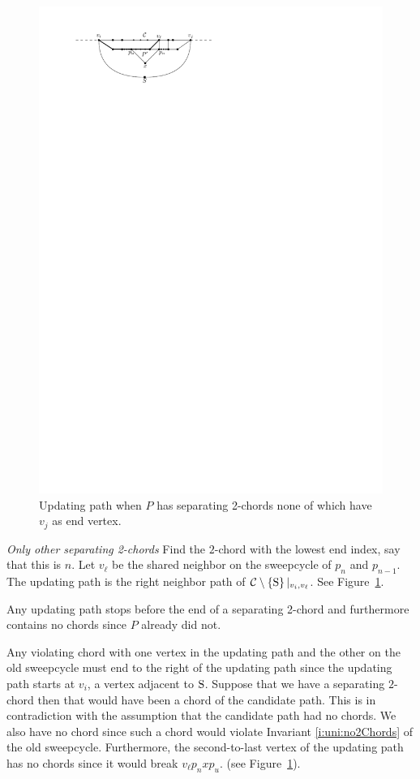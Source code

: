 \begin{figure}[t]
      \includegraphics[scale=1]{unifiedAlgo/img/sweep/cases/free2chord}
      \caption{Updating path when $P$ has separating 2-chords none of which have $v_j$ as end vertex.}
      \label{fig:sweep:free2chord}
    \end{figure}

    \emph{Only other separating 2-chords}
      Find the $2$-chord with the lowest end index, say that this is $n$.
      Let $v_\ell$ be the shared neighbor on the sweepcycle of $p_{n}$ and $p_{n-1}$.
      The updating path is the right neighbor path of $\mathcal{C} \setminus \left\lbrace {\mathrm{S}} \right\rbrace|_{v_i, v_\ell}$. See Figure~\ref{fig:sweep:free2chord}.

      Any updating path stops before the end of a separating 2-chord and furthermore contains no chords since $P$ already did not.

      Any violating chord with one vertex in the updating path and the other on the old sweepcycle must end to the right of the updating path since the updating path starts at $v_i$, a vertex adjacent to $\mathrm{S}$.
      Suppose that we have a separating $2$-chord then that would have been a chord of the candidate path. This is in contradiction with the assumption that the candidate path had no chords.
      We also have no chord since such a chord would violate Invariant \ref{i:uni:no2Chords} of the old sweepcycle. Furthermore, the second-to-last vertex of the updating path has no chords since it would break $v_\ell p_n x p_u$. (see Figure~\ref{fig:sweep:free2chord}).

